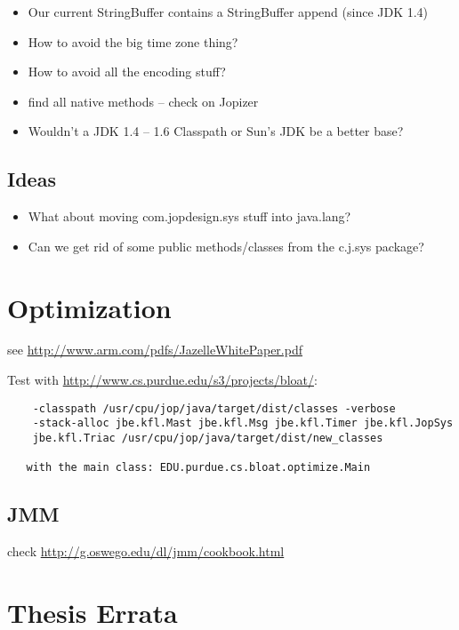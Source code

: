 \documentclass[a4paper,12pt]{scrartcl}
\begin{document}
\begin{itemize}
  \item Our current StringBuffer contains a StringBuffer append
      (since JDK 1.4)
  \item How to avoid the big time zone thing?
  \item How to avoid all the encoding stuff?
  \item find all native methods -- check on Jopizer
  \item Wouldn't a JDK 1.4 -- 1.6 Classpath or Sun's JDK be a
      better base?
\end{itemize}

\subsection{Ideas}

\begin{itemize}
  \item What about moving com.jopdesign.sys stuff into java.lang?
  \item Can we get rid of some public methods/classes from the
      c.j.sys package?
\end{itemize}



\section{Optimization}

see \url{http://www.arm.com/pdfs/JazelleWhitePaper.pdf}

Test with \url{http://www.cs.purdue.edu/s3/projects/bloat/}:

\begin{verbatim}
    -classpath /usr/cpu/jop/java/target/dist/classes -verbose
    -stack-alloc jbe.kfl.Mast jbe.kfl.Msg jbe.kfl.Timer jbe.kfl.JopSys
    jbe.kfl.Triac /usr/cpu/jop/java/target/dist/new_classes

   with the main class: EDU.purdue.cs.bloat.optimize.Main
\end{verbatim}

\subsection{JMM}

check \url{http://g.oswego.edu/dl/jmm/cookbook.html}

\section{Thesis Errata}
\end{document}
